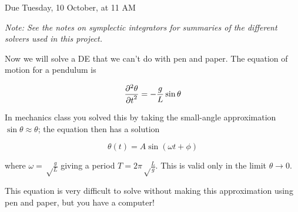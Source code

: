 \documentclass[12pt]{article}
\def\PARTWO#1#2{ {{\partial^2 #1}\over{\partial #2}^2} }
\begin{document}
\Large
\centerline{}
\centerline{Due Tuesday, 10 October, at 11 AM}
\normalsize


\begin{center}
\it Note: See the notes on symplectic integrators for summaries of the different solvers used in this project.
\end{center}

Now we will solve a DE that we can't do with pen and paper. The equation of motion for a pendulum is


\begin{equation}
\PARTWO{\theta}{t}=-\frac{g}{L} \sin \theta
\end{equation}

In mechanics class you solved this by taking the small-angle approximation $\sin \theta \approx \theta$; the equation then has a solution

\begin{equation}
\theta(t) = A \sin (\omega t + \phi)
\end{equation}

where $\omega=\sqrt\frac{g}{L}$ giving a period $T=2\pi\sqrt\frac{L}{g}$. This is valid only in the limit $\theta \rightarrow 0$.

This equation is very difficult to solve without making this approximation using pen and paper, but you have a computer! 
\end{document}

